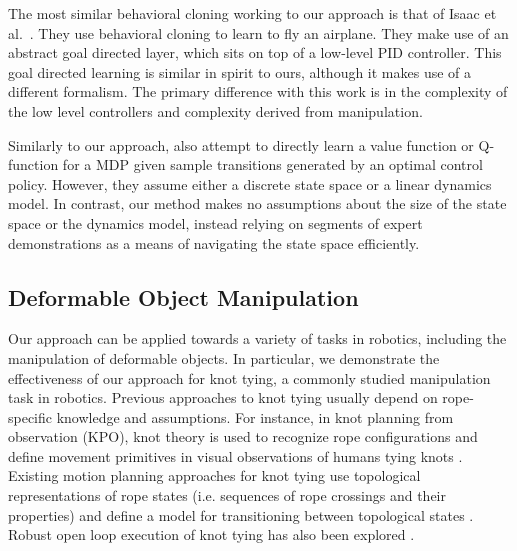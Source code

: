 The most similar behavioral cloning working to our approach is that of Isaac et al.~. 
They use behavioral cloning to learn to fly an airplane.
They make use of an abstract goal directed layer, which sits on top of a low-level PID controller.
This goal directed learning is similar in spirit to ours, although it makes use of a different formalism.
The primary difference with this work is in the complexity of the low level controllers and complexity derived from manipulation.

Similarly to our approach, \citet{Dvijotham_ICML2010} also attempt to directly
learn a value function or Q-function for a MDP given sample transitions
generated by an optimal control policy. However, they assume either a discrete
state space or a linear dynamics model. In contrast, our method makes no
assumptions about the size of the state space or the dynamics model, instead
relying on segments of expert demonstrations as a means of navigating the state
space efficiently. 

\subsection{Deformable Object Manipulation}
Our approach can be applied towards a variety of tasks in robotics,
including the manipulation of deformable objects.
In particular, we demonstrate the effectiveness of our approach for
knot tying, a commonly studied manipulation task in robotics.
Previous approaches to knot tying usually depend on rope-specific knowledge
and assumptions.
For instance, in knot planning from observation (KPO), knot theory is used
to recognize rope configurations and define movement primitives in visual
observations of humans tying knots \cite{Morita_ICRA2003, Takamatsu_TransRob2006}.
Existing motion planning approaches for knot tying use topological
representations of rope states (i.e. sequences of rope crossings and their
properties) and define a model for transitioning between topological states
\cite{Saha_ExpRobotics2008, Wakamatsu_IJRR2006}.
Robust open loop execution of knot tying has also been explored \cite{Bell_PhD2010}.
